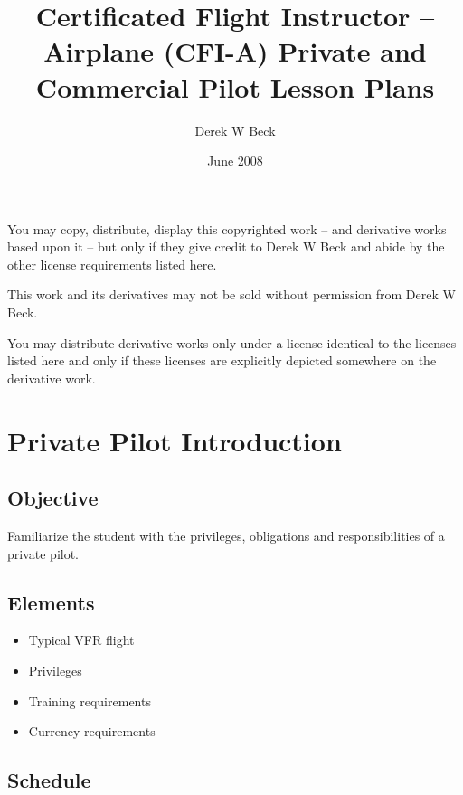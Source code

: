 \documentclass[twoside,openright]{report}
\title{Certificated Flight Instructor – Airplane (CFI-A)
Private and Commercial Pilot Lesson Plans}
\author{Derek W Beck}
\date{June 2008}
\begin{document}
\makeatletter
\begin{titlepage}
  \begin{center}
    \vspace*{1cm}
    \textbf{\@title}

    \vspace*{1cm}
    \@author

    \@date

    \vspace*{2cm}
    \ccby You may copy, distribute, display this copyrighted work -- and
    derivative works based upon it -- but only if they give credit to Derek W
    Beck and abide by the other license requirements listed here.

    \ccnc This work and its derivatives may not be sold without permission from
    Derek W Beck.

    \ccsa You may distribute derivative works only under a license identical to
    the licenses listed here and only if these licenses are explicitly depicted
    somewhere on the derivative work.
  \end{center}
\end{titlepage}

\setcounter{tocdepth}{0}
\tableofcontents

\chapter{Private Pilot Introduction}

\section{Objective}

Familiarize the student with the privileges, obligations and responsibilities
of a private pilot.

\section{Elements}

\begin{itemize}
  \item Typical VFR flight
  \item Privileges
  \item Training requirements
  \item Currency requirements
\end{itemize}

\section{Schedule}
\end{document}
